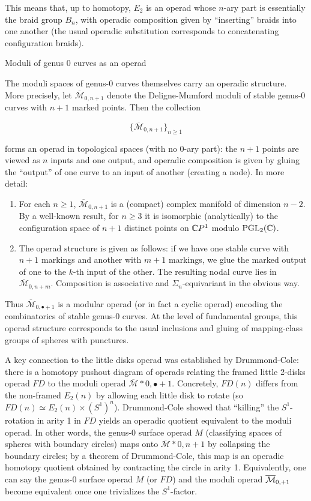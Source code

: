 This means that, up to homotopy, $E_2$ is an operad whose $n$-ary part is essentially the braid group $B_n$, with operadic composition given by “inserting” braids into one another (the usual operadic substitution corresponds to concatenating configuration braids).

Moduli of genus 0 curves as an operad

The moduli spaces of genus-0 curves themselves carry an operadic structure.  More precisely, let $\overline{\mathcal{M}}_{0,n+1}$ denote the Deligne-Mumford moduli of stable genus-0 curves with $n+1$ marked points.  Then the collection

$$
  \{\overline{\mathcal{M}}_{0,n+1}\}_{n\ge1}
$$

forms an operad in topological spaces (with no $0$-ary part): the $n+1$ points are viewed as $n$ inputs and one output, and operadic composition is given by gluing the “output” of one curve to an input of another (creating a node).  In more detail:

\begin{enumerate}
    \item For each $n\ge1$, $\overline{\mathcal{M}}_{0,n+1}$ is a (compact) complex manifold of dimension $n-2$.  By a well-known result, for $n\ge3$ it is isomorphic (analytically) to the configuration space of $n+1$ distinct points on $\mathbb{C} P^1$ modulo $\mathrm{PGL}_2(\mathbb{C})$.
    \item The operad structure is given as follows: if we have one stable curve with $n+1$ markings and another with $m+1$ markings, we glue the marked output of one to the $k$-th input of the other.  The resulting nodal curve lies in $\overline{\mathcal{M}}_{0,n+m}$.  Composition is associative and $\Sigma_n$-equivariant in the obvious way.
\end{enumerate}

Thus $\overline{\mathcal{M}}_{0,\bullet+1}$ is a modular operad (or in fact a cyclic operad) encoding the combinatorics of stable genus-0 curves.  At the level of fundamental groups, this operad structure corresponds to the usual inclusions and gluing of mapping-class groups of spheres with punctures.

A key connection to the little disks operad was established by Drummond-Cole: there is a homotopy pushout diagram of operads relating the framed little 2-disks operad $FD$ to the moduli operad $\overline{\mathcal{M}}*{0,\bullet+1}$.  Concretely, $FD(n)$ differs from the non-framed $E_2(n)$ by allowing each little disk to rotate (so $FD(n)\simeq E_2(n)\times (S^1)^n$).  Drummond-Cole showed that “killing” the $S^1$-rotation in arity 1 in $FD$ yields an operadic quotient equivalent to the moduli operad.  In other words, the genus-0 surface operad $M$ (classifying spaces of spheres with boundary circles) maps onto ${\overline{\mathcal{M}}*{0,n+1}}$ by collapsing the boundary circles; by a theorem of Drummond-Cole, this map is an operadic homotopy quotient obtained by contracting the circle in arity 1.  Equivalently, one can say the genus-0 surface operad $M$ (or $FD$) and the moduli operad $\overline{\mathcal{M}}_{0,\*+1}$ become equivalent once one trivializes the $S^1$-factor.

